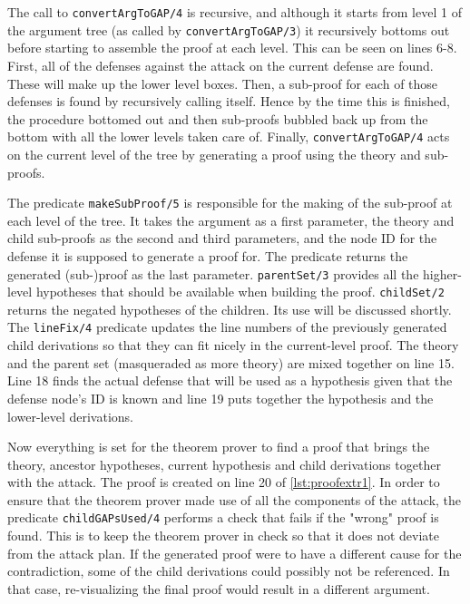 \documentclass[11pt,twoside,a4paper]{report}
\begin{document}
The call to \lstinline$convertArgToGAP/4$ is recursive, and although it starts from level 1 of the argument tree (as called by \lstinline$convertArgToGAP/3$) it recursively bottoms out before starting to assemble the proof at each level. This can be seen on lines 6-8. First, all of the defenses against the attack on the current defense are found. These will make up the lower level boxes. Then, a sub-proof for each of those defenses is found by recursively calling itself. Hence by the time this is finished, the procedure bottomed out and then sub-proofs bubbled back up from the bottom with all the lower levels taken care of. Finally, \lstinline$convertArgToGAP/4$ acts on the current level of the tree by generating a proof using the theory and sub-proofs.

The predicate \lstinline$makeSubProof/5$ is responsible for the making of the sub-proof at each level of the tree. It takes the argument as a first parameter, the theory and child sub-proofs as the second and third parameters, and the node ID for the defense it is supposed to generate a proof for. The predicate returns the generated (sub-)proof as the last parameter. \lstinline$parentSet/3$ provides all the higher-level hypotheses that should be available when building the proof. \lstinline$childSet/2$ returns the negated hypotheses of the children. Its use will be discussed shortly. The \lstinline$lineFix/4$ predicate updates the line numbers of the previously generated child derivations so that they can fit nicely in the current-level proof. The theory and the parent set (masqueraded as more theory) are mixed together on line 15. Line 18 finds the actual defense that will be used as a hypothesis given that the defense node's ID is known and line 19 puts together the hypothesis and the lower-level derivations.

Now everything is set for the theorem prover to find a proof that brings the theory, ancestor hypotheses, current hypothesis and child derivations together with the attack. The proof is created on line 20 of \autoref{lst:proofextr1}. In order to ensure that the theorem prover made use of all the components of the attack, the predicate \lstinline$childGAPsUsed/4$ performs a check that fails if the "wrong" proof is found. This is to keep the theorem prover in check so that it does not deviate from the attack plan. If the generated proof were to have a different cause for the contradiction, some of the child derivations could possibly not be referenced. In that case, re-visualizing the final proof would result in a different argument.
\end{document}
